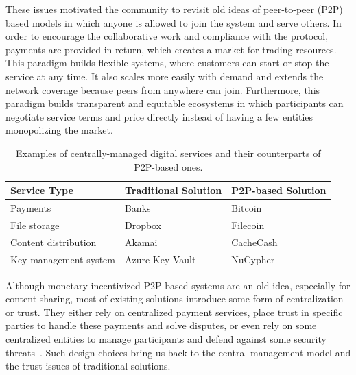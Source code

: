 \documentclass{llncs}
\begin{document}
These issues motivated the community to revisit old ideas of peer-to-peer (P2P) based models in which anyone is allowed to join the system and serve others.
In order to encourage the collaborative work and compliance with the protocol, payments are provided in return, which creates a market for trading resources.
This paradigm builds flexible systems, where customers can start or stop the service at any time.
It also scales more easily with demand and extends the network coverage because peers from anywhere can join.
Furthermore, this paradigm builds transparent and equitable ecosystems in which participants can negotiate service terms and price directly instead of having a few entities monopolizing the market.


\begin{table}[t!]
\caption{Examples of centrally-managed digital services and their counterparts of P2P-based ones.} 
\label{service-examples}
\centering 
\begin{tabular}{| p{}  | p{} | p{} |}\hline\hline

{\bf Service Type} & {\bf Traditional Solution} & {\bf P2P-based Solution}  \\[0.5ex] \hline \hline
 
Payments & Banks & Bitcoin  \\[0.5ex] \hline

File storage & Dropbox~\cite{dropbox} &  Filecoin~\cite{filecoin}  \\ [0.5ex]  \hline   

Content distribution & Akamai~\cite{akamai} & CacheCash~\cite{almashaqbeh2019cachecash}  \\ [0.5ex]  \hline
    
Key management system & Azure Key Vault~\cite{azure} & NuCypher~\cite{nucypher}  \\ [0.5ex]  \hline    

\end{tabular}
\end{table} 



Although monetary-incentivized P2P-based systems are an old idea, especially for content sharing, most of existing solutions introduce some form of centralization or trust. They either rely on centralized payment services, place trust in specific parties to handle these payments and solve disputes, or even rely on some centralized entities to manage participants and defend against some security threats~\cite{Kassa13,Nair08,Zhang09}. Such design choices bring us back to the central management model and the trust issues of traditional solutions.
\end{document}
